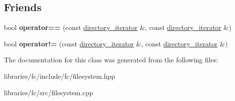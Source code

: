 \subsection*{Friends}
\begin{DoxyCompactItemize}
\item 
\mbox{\label{classfc_1_1directory__iterator_a7c558731903d512fc41e9d6bf929926a}} 
bool {\bfseries operator==} (const \mbox{\hyperlink{classfc_1_1directory__iterator}{directory\+\_\+iterator}} \&, const \mbox{\hyperlink{classfc_1_1directory__iterator}{directory\+\_\+iterator}} \&)
\item 
\mbox{\label{classfc_1_1directory__iterator_a2382d11de064c526347c37c23806494d}} 
bool {\bfseries operator!=} (const \mbox{\hyperlink{classfc_1_1directory__iterator}{directory\+\_\+iterator}} \&, const \mbox{\hyperlink{classfc_1_1directory__iterator}{directory\+\_\+iterator}} \&)
\end{DoxyCompactItemize}


The documentation for this class was generated from the following files\+:\begin{DoxyCompactItemize}
\item 
libraries/fc/include/fc/filesystem.\+hpp\item 
libraries/fc/src/filesystem.\+cpp\end{DoxyCompactItemize}
